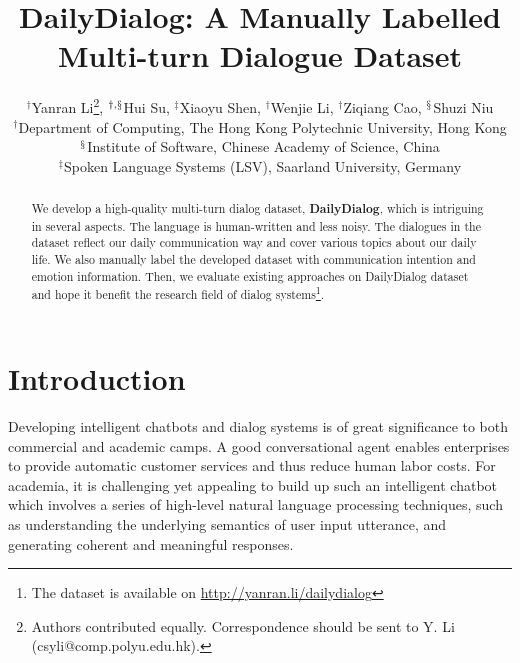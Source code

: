 \documentclass[11pt,letterpaper]{article}
\title{DailyDialog: A Manually Labelled Multi-turn Dialogue Dataset}
\author{$^{\dagger}$Yanran Li\thanks{Authors contributed equally. Correspondence should be sent to Y. Li (csyli@comp.polyu.edu.hk).}, $^{\dagger,\mathsection}$Hui Su\footnotemark[1], $^{\ddagger}$Xiaoyu Shen, $^{\dagger}$Wenjie Li, $^{\dagger}$Ziqiang Cao, $^{\mathsection}$Shuzi Niu\\
       $^{\dagger}$Department of Computing, The Hong Kong Polytechnic University, Hong Kong\\
	  $^{\mathsection}$Institute of Software, Chinese Academy of Science, China\\
      $^{\ddagger}$Spoken Language Systems (LSV), Saarland University, Germany
       }
\date{}
\begin{document}
\maketitle

\begin{abstract}
We develop a high-quality multi-turn dialog dataset, \textbf{DailyDialog}, which is intriguing in several aspects. The language is human-written and less noisy. The dialogues in the dataset reflect our daily communication way and cover various topics about our daily life. We also manually label the developed dataset with communication intention and emotion information. Then, we evaluate existing approaches on DailyDialog dataset and hope it benefit the research field of dialog systems\footnote{The dataset is available on \url{http://yanran.li/dailydialog}}.
\end{abstract}

\section{Introduction}
Developing intelligent chatbots and dialog systems is of great significance to both commercial and academic camps. A good conversational agent enables enterprises to provide automatic customer services and thus reduce human labor costs. For academia, it is challenging yet appealing to build up such an intelligent chatbot which involves a series of high-level natural language processing techniques, such as understanding the underlying semantics of user input utterance, and generating coherent and meaningful responses. 
\end{document}

